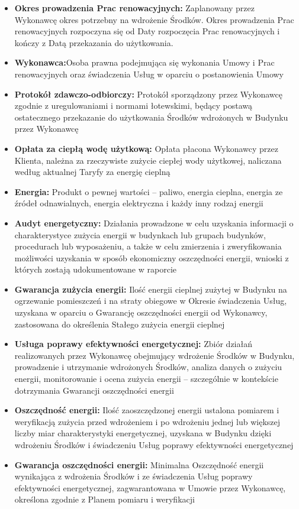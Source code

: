 \begin{multicols}{2}
\begin{itemize}[label={}]
	\item\textbf{Okres prowadzenia Prac renowacyjnych:} Zaplanowany przez Wykonawcę okres potrzebny na wdrożenie Środków. Okres prowadzenia Prac renowacyjnych rozpoczyna się od Daty rozpoczęcia Prac renowacyjnych i kończy z Datą przekazania do użytkowania.
	\item\textbf{Wykonawca:}Osoba prawna podejmująca się wykonania Umowy i Prac renowacyjnych oraz świadczenia Usług w oparciu o postanowienia Umowy
	\item\textbf{Protokół zdawczo-odbiorczy:} Protokół sporządzony przez Wykonawcę zgodnie z uregulowaniami i normami łotewskimi, będący postawą ostatecznego przekazanie do użytkowania Środków wdrożonych w Budynku przez Wykonawcę
	\item\textbf{Opłata za ciepłą wodę użytkową:} Opłata płacona Wykonawcy przez Klienta, należna za rzeczywiste zużycie ciepłej wody użytkowej, naliczana według aktualnej Taryfy za energię cieplną
	\item\textbf{Energia:} Produkt o pewnej wartości – paliwo, energia cieplna, energia ze źródeł odnawialnych, energia elektryczna i każdy inny rodzaj energii
	\item\textbf{Audyt energetyczny:} Działania prowadzone w celu uzyskania informacji o charakterystyce zużycia energii w budynkach lub grupach budynków, procedurach lub wyposażeniu, a także w celu zmierzenia i zweryfikowania możliwości uzyskania w sposób ekonomiczny oszczędności energii, wnioski z których zostają udokumentowane w raporcie
	\item\textbf{Gwarancja zużycia energii:} Ilość energii cieplnej zużytej w Budynku na ogrzewanie pomieszczeń i na straty obiegowe w Okresie świadczenia Usług, uzyskana w oparciu o Gwarancję oszczędności energii od Wykonawcy, zastosowana do określenia Stałego zużycia energii cieplnej
	\item\textbf{Usługa poprawy efektywności energetycznej:} Zbiór działań realizowanych przez Wykonawcę obejmujący wdrożenie Środków w Budynku, prowadzenie i utrzymanie wdrożonych Środków, analiza danych o zużyciu energii, monitorowanie i ocena zużycia energii – szczególnie w kontekście dotrzymania Gwarancji oszczędności energii
	\item\textbf{Oszczędność energii:} Ilość zaoszczędzonej energii ustalona pomiarem i weryfikacją zużycia przed wdrożeniem i po wdrożeniu jednej lub większej liczby miar charakterystyki energetycznej, uzyskana w Budynku dzięki wdrożeniu Środków i świadczeniu Usług poprawy efektywności energetycznej
	\item\textbf{Gwarancja oszczędności energii:} Minimalna Oszczędność energii wynikająca z wdrożenia Środków i ze świadczenia Usług poprawy efektywności energetycznej, zagwarantowana w Umowie przez Wykonawcę, określona zgodnie z Planem pomiaru i weryfikacji

\end{itemize}
\end{multicols}
